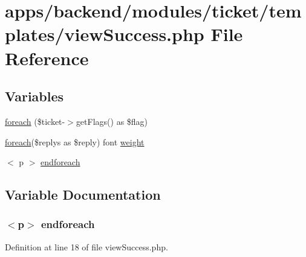\hypertarget{backend_2modules_2ticket_2templates_2view_success_8php}{\section{apps/backend/modules/ticket/templates/view\-Success.php File Reference}
\label{backend_2modules_2ticket_2templates_2view_success_8php}
}
\subsection*{Variables}
\begin{DoxyCompactItemize}
\item 
\hyperlink{backend_2modules_2ticket_2templates_2view_success_8php_a3e0ec78664d75962474ef9285a0b35be}{foreach} (\$ticket-\/$>$get\-Flags() as \$flag)
\item 
\hyperlink{presse_2modules_2news_2templates_2index_success_8php_abc56db52b2e9a59bcd5c9e45ac5cb332}{foreach}(\$replys as \$reply) font \hyperlink{backend_2modules_2ticket_2templates_2view_success_8php_a0606eb323109b2a07a4e4eadb81eb263}{weight}
\item 
$<$ p $>$ \hyperlink{backend_2modules_2ticket_2templates_2view_success_8php_ab7f591bedb8aa5c991e8abe6a7f92b43}{endforeach}
\end{DoxyCompactItemize}


\subsection{Variable Documentation}
\hypertarget{backend_2modules_2ticket_2templates_2view_success_8php_ab7f591bedb8aa5c991e8abe6a7f92b43}{
\subsubsection[{endforeach}]{\setlength{\rightskip}{0pt plus 5cm}$<$p$>$ endforeach}}\label{backend_2modules_2ticket_2templates_2view_success_8php_ab7f591bedb8aa5c991e8abe6a7f92b43}


Definition at line 18 of file view\-Success.\-php.

